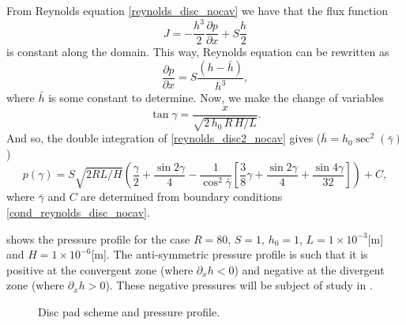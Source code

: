 From Reynolds equation \eqref*{reynolds_disc_nocav} we have that the flux function $$J=-\frac{h^3}{2}\frac{\partial p}{\partial x}+S\frac{h}{2}$$ is constant along the domain. This way, Reynolds equation can be rewritten as
\begin{equation}
\frac{\partial p}{\partial x}=S\frac{(h-\bar{h})}{h^3},\label{eq:reynolds_disc2_nocav}
\end{equation}
where $\bar{h}$ is some constant to determine. Now, we make the change of variables
\begin{equation*}
\tan{\gamma}=\frac{x}{\sqrt{2\,h_0\,R\,H/L}}.
\end{equation*}
And so, the double integration of \eqref{reynolds_disc2_nocav} gives ($\bar{h}=h_0\sec^2(\bar{\gamma})$)
\begin{equation}
p(\gamma)=S\sqrt{2RL/H}\left(\frac{\gamma}{2}+\frac{\sin{2\gamma}}{4}-\frac{1}{\cos^2\bar{\gamma}}\left[\frac{3}{8}\gamma+\frac{\sin 2\gamma}{4}+\frac{\sin 4\gamma}{32}\right]\right)+C,
\end{equation}
where $\bar{\gamma}$ and $C$ are determined from boundary conditions \eqref*{cond_reynolds_disc_nocav}.

 shows the pressure profile for the case $R=80$, $S=1$, $h_0=1$, $L=1\times 10^{-3}$[m] and $H=1\times 10^{-6}$[m]. The anti-symmetric pressure profile is such that it is positive at the convergent zone (where $\partial_x  h <0$) and negative at the divergent zone (where $\partial_x  h >0$). These negative pressures will be subject of study in .

 \begin{figure}[ht!]
 \centering 
 \def\svgwidth{\textwidth}	
\caption{Disc pad scheme and pressure profile.}\label{fig:pad_disc_pressure_prof}
\end{figure}




